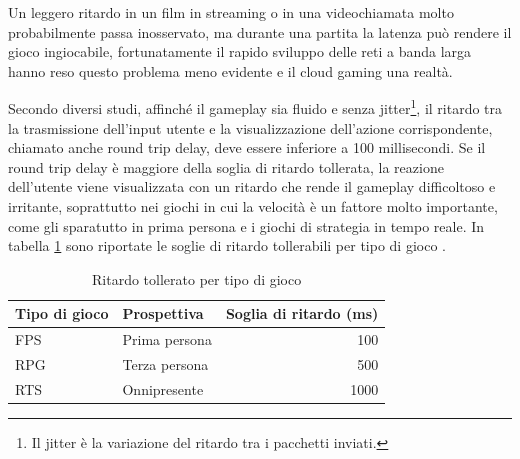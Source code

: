 Un leggero ritardo in un film in streaming o in una videochiamata molto probabilmente passa inosservato, ma durante una partita la latenza può rendere il gioco ingiocabile, fortunatamente il rapido sviluppo delle reti a banda larga hanno reso questo problema meno evidente e il cloud gaming una realtà.

Secondo diversi studi, affinché il gameplay sia fluido e senza jitter\footnote{Il jitter è la variazione del ritardo tra i pacchetti inviati.}, il ritardo tra la trasmissione dell'input utente e la visualizzazione dell'azione corrispondente, chiamato anche round trip delay, deve essere inferiore a 100 millisecondi. Se il round trip delay è maggiore della soglia di ritardo tollerata, la reazione dell'utente viene visualizzata con un ritardo che rende il gameplay difficoltoso e irritante, soprattutto nei giochi in cui la velocità è un fattore molto importante, come gli sparatutto in prima persona e i giochi di strategia in tempo reale. In tabella \ref{table:Ritardo_tollerato_per_tipo_di_gioco} sono riportate le soglie di ritardo tollerabili per tipo di gioco \parencite{Cloud_Gaming_Architecture_and_Performance}.

\begin{table}[H]
	\centering
	\begin{tabular}{||l l r||}
		\hline
		Tipo di gioco & Prospettiva & Soglia di ritardo (ms) \\
		\hline\hline
		FPS & Prima persona & 100 \\
		\hline
		RPG & Terza persona & 500 \\
		\hline
		RTS & Onnipresente & 1000 \\
		\hline
	\end{tabular}

	\caption{Ritardo tollerato per tipo di gioco}
	\label{table:Ritardo_tollerato_per_tipo_di_gioco}
\end{table}



